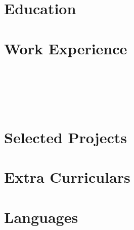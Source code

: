 \documentclass[a4paper,11pt]{article}
\begin{document}
\pagestyle{empty}




\section{Education}



\section{Work Experience}
 \\[10pt]
 \\[8pt]
 \\[10pt]
 \\[-14pt]

\section{Selected Projects}
%  

\section{Extra Curriculars}

\section{Languages}

\end{document}
